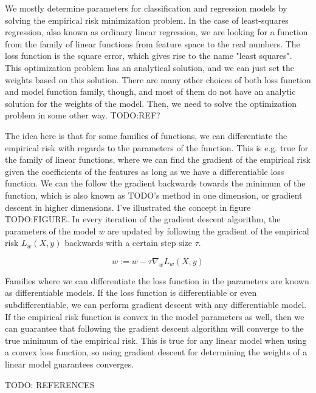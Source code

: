 We mostly determine parameters for classification and regression models by
solving the empirical risk minimization problem. In the case of least-squares
regression, also known as ordinary linear regression, we are looking for a
function from the family of linear functions from feature space to the real
numbers. The loss function is the square error, which gives rise to the name
"least squares". This optimization problem has an analytical solution, and we
can just set the weights based on this solution. There are many other choices of
both loss function and model function family, though, and most of them do not
have an analytic solution for the weights of the model. Then, we need to solve
the optimization problem in some other way. TODO:REF?

The idea here is that for some families of functions, we can differentiate the
empirical risk with regards to the parameters of the function. This is e.g. true
for the family of linear functions, where we can find the gradient of the
empirical risk given the coefficients of the features as long as we have a
differentiable loss function. We can the follow the gradient backwards towards
the minimum of the function, which is also known as TODO's method in one
dimension, or gradient descent in higher dimensions. I've illustrated the
concept in figure TODO:FIGURE. In every iteration of the gradient descent
algorithm, the parameters of the model $w$ are updated by following the gradient
of the empirical risk $L_w(X,y)$ backwards with a certain step size $\tau$. 

\begin{equation}
  w := w - \tau \nabla_w L_w(X,y)
\end{equation}

Families where we can differentiate the loss function in the parameters are
known as differentiable models. If the loss function is differentiable or even
subdifferentiable, we can perform gradient descent with any differentiable
model. If the empirical risk function is convex in the model parameters as well,
then we can guarantee that following the gradient descent algorithm will
converge to the true minimum of the empirical risk. This is true for any linear
model when using a convex loss function, so using gradient descent for
determining the weights of a linear model guarantees converges.

TODO: REFERENCES

